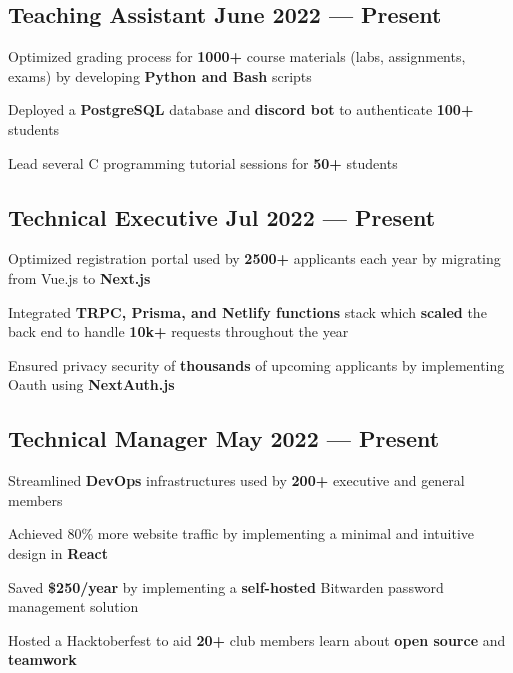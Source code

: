 \subsection{{Teaching Assistant \hfill June 2022 --- Present}}
\begin{zitemize}
\item Optimized grading process for \textbf{1000+} course materials (labs, assignments, exams) by developing \textbf{Python and Bash} scripts
\item Deployed a \textbf{PostgreSQL} database and \textbf{discord bot} to authenticate \textbf{100+} students
\item Lead several C programming tutorial sessions for \textbf{50+} students
\end{zitemize}

\vspace{0.3cm}\subsection{{Technical Executive \hfill Jul 2022 --- Present}}
\begin{zitemize}
\item Optimized registration portal used by \textbf{2500+} applicants each year by migrating from Vue.js to \textbf{Next.js}
\item Integrated \textbf{TRPC, Prisma, and Netlify functions} stack which \textbf{scaled} the back end to handle \textbf{10k+} requests throughout the year
\item Ensured privacy security of \textbf{thousands} of upcoming applicants by implementing Oauth using \textbf{NextAuth.js}
\end{zitemize}

\vspace{0.3cm}\subsection{{Technical Manager  \hfill May 2022 --- Present}}
\begin{zitemize}
\item Streamlined \textbf{DevOps} infrastructures used by \textbf{200+} executive and general members
\item Achieved 80\% more website traffic by implementing a minimal and intuitive design in \textbf{React}
\item Saved \textbf{\$250/year} by implementing a \textbf{self-hosted} Bitwarden password management solution
\item Hosted a Hacktoberfest to aid \textbf{20+} club members learn about \textbf{open source} and \textbf{teamwork}
\end{zitemize}


